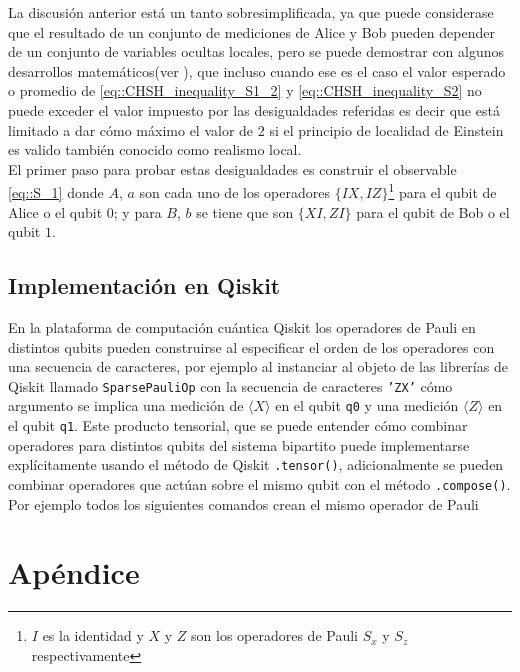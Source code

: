 \documentclass[a4paper]{article}
\begin{document}
La discusión anterior está un tanto sobresimplificada, ya que puede considerase que el resultado de un conjunto de mediciones de Alice y Bob pueden depender de un conjunto de variables ocultas locales, pero se puede demostrar con algunos desarrollos matemáticos(ver \cite{Clauser}), que incluso cuando ese es el caso el valor esperado o promedio de \ref{eq::CHSH_inequality_S1_2} y \ref{eq::CHSH_inequality_S2} no puede exceder el valor impuesto por las desigualdades referidas es decir que está limitado a dar cómo máximo el valor de $2$ si el principio de localidad de Einstein es valido también conocido como realismo local.\\

El primer paso para probar estas desigualdades es construir el observable \ref{eq::S_1} donde $A$, $a$ son cada uno de los operadores $\{IX, IZ\}$\footnote{$I$ es la identidad y $X$ y $Z$ son los operadores de Pauli $S_x$ y $S_z$ respectivamente} para el qubit de Alice o el qubit $0$; y para $B$, $b$ se tiene que son $\{XI, ZI\}$ para el qubit de Bob o el qubit $1$.
\subsection{Implementación en Qiskit}
En la plataforma de computación cuántica Qiskit los operadores de Pauli en distintos qubits pueden construirse al especificar el orden de los operadores con una secuencia de caracteres, por ejemplo al instanciar al objeto de las librerías de Qiskit llamado \texttt{SparsePauliOp} con la secuencia de caracteres \texttt{'ZX'} cómo argumento se implica una medición de $\langle X \rangle$ en el qubit \texttt{q0} y una medición $\langle Z \rangle$ en el qubit \texttt{q1}. Este producto tensorial, que se puede entender cómo combinar operadores para distintos qubits del sistema bipartito puede implementarse explícitamente usando el método de Qiskit \texttt{.tensor()}, adicionalmente se pueden combinar operadores que actúan sobre el mismo qubit con el método \texttt{.compose()}. Por ejemplo todos los siguientes comandos crean el mismo operador de Pauli


\section{Apéndice}\label{sec::appendix}
\end{document}
